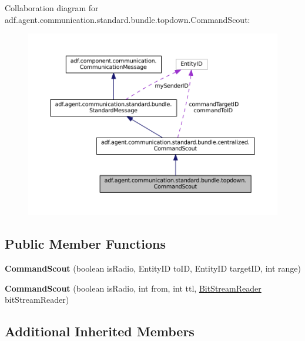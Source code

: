 Collaboration diagram for adf.\+agent.\+communication.\+standard.\+bundle.\+topdown.\+Command\+Scout\+:
\nopagebreak
\begin{figure}[H]
\begin{center}
\leavevmode
\includegraphics[width=350pt]{classadf_1_1agent_1_1communication_1_1standard_1_1bundle_1_1topdown_1_1CommandScout__coll__graph}
\end{center}
\end{figure}
\subsection*{Public Member Functions}
\begin{DoxyCompactItemize}
\item 
\hypertarget{classadf_1_1agent_1_1communication_1_1standard_1_1bundle_1_1topdown_1_1CommandScout_ac0a0110b57ef6dbb1974ce6162860868}{}\label{classadf_1_1agent_1_1communication_1_1standard_1_1bundle_1_1topdown_1_1CommandScout_ac0a0110b57ef6dbb1974ce6162860868} 
{\bfseries Command\+Scout} (boolean is\+Radio, Entity\+ID to\+ID, Entity\+ID target\+ID, int range)
\item 
\hypertarget{classadf_1_1agent_1_1communication_1_1standard_1_1bundle_1_1topdown_1_1CommandScout_acdf95a514aa45b155b08d4b250343c9b}{}\label{classadf_1_1agent_1_1communication_1_1standard_1_1bundle_1_1topdown_1_1CommandScout_acdf95a514aa45b155b08d4b250343c9b} 
{\bfseries Command\+Scout} (boolean is\+Radio, int from, int ttl, \hyperlink{classadf_1_1component_1_1communication_1_1util_1_1BitStreamReader}{Bit\+Stream\+Reader} bit\+Stream\+Reader)
\end{DoxyCompactItemize}
\subsection*{Additional Inherited Members}


